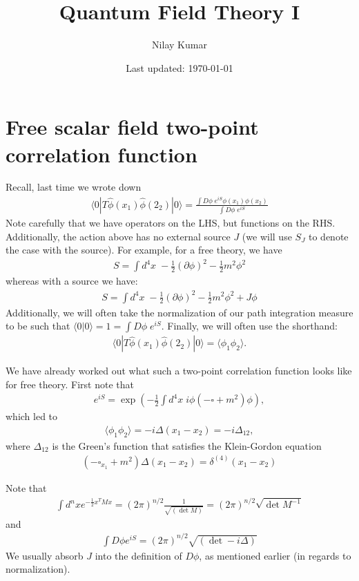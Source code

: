 \documentclass{../mathnotes}
\title{Quantum Field Theory I}
\author{Nilay Kumar}
\date{Last updated: \today}
\begin{document}
\maketitle

\section{Free scalar field two-point correlation function}

Recall, last time we wrote down
\begin{align*}
    \langle 0|T\hat{\phi}(x_1)\hat{\phi}(2_2)|0\rangle = \frac{\int D\phi\; e^{iS}\phi(x_1)\phi(x_2)}{\int D\phi\;e^{iS}}
\end{align*}
Note carefully that we have operators on the LHS, but functions on the RHS. Additionally, the action above has no external source $J$
(we will use $S_J$ to denote the case with the source). For example, for a free theory, we have
\begin{align*}
    S=\int d^4 x\;-\frac{1}{2}(\partial \phi)^2-\frac{1}{2}m^2\phi^2
\end{align*}
whereas with a source we have:
\begin{align*}
    S=\int d^4 x\;-\frac{1}{2}(\partial \phi)^2-\frac{1}{2}m^2\phi^2+J\phi
\end{align*}
Additionally, we will often take the normalization of our path integration measure to be such that $\langle 0|0\rangle=1=\int D\phi\; e^{iS}$.
Finally, we will often use the shorthand:
\begin{align*}
    \langle 0|T\hat{\phi}(x_1)\hat{\phi}(2_2)|0\rangle=\langle \phi_1 \phi_2\rangle.
\end{align*}

We have already worked out what such a two-point correlation function looks like for free theory. First note that
\begin{align*}
    e^{iS}=\exp\left(-\frac{1}{2}\int d^4x\;i\phi\left( -\square+m^2 \right)\phi\right),
\end{align*}
which led to
\begin{align*}
    \langle \phi_1\phi_2\rangle=-i\Delta(x_1-x_2)=-i\Delta_{12},
\end{align*}
where $\Delta_{12}$ is the Green's function that satisfies the Klein-Gordon equation
\begin{align*}
    \left( -\square_{x_1}+m^2 \right)\Delta(x_1-x_2)=\delta^{(4)}(x_1-x_2)
\end{align*}

\begin{rem}
    Note that
    \begin{align*}
        \int d^nx e^{-\frac{1}{2}x^TMx}=(2\pi)^{n/2}\frac{1}{\sqrt{\left( \det M \right)}}=(2\pi)^{n/2}\sqrt{\det M^{-1}}
    \end{align*}
    and
    \begin{align*}
        \int D\phi e^{iS}=(2\pi)^{n/2} \sqrt{\left( \det -i\Delta \right)}
    \end{align*}
    We usually absorb $J$ into the definition of $D\phi$, as mentioned earlier (in regards to normalization).
\end{rem}
\end{document}
